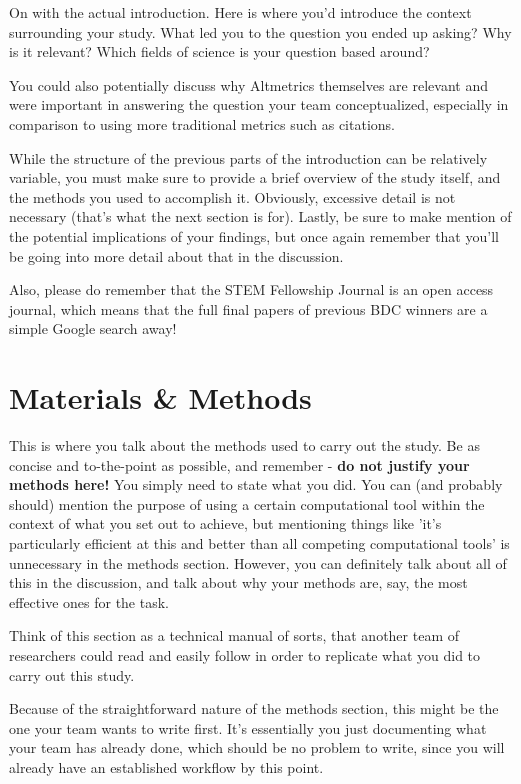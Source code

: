 \documentclass[10pt, letterpaper]{article}
\begin{document}
On with the actual introduction. Here is where you'd introduce the context surrounding your study. What led you to the question you ended up asking? Why is it relevant? Which fields of science is your question based around?

You could also potentially discuss why Altmetrics themselves are relevant and were important in answering the question your team conceptualized, especially in comparison to using more traditional metrics such as citations.

While the structure of the previous parts of the introduction can be relatively variable, you must make sure to provide a brief overview of the study itself, and the methods you used to accomplish it. Obviously, excessive detail is not necessary (that's what the next section is for). Lastly, be sure to make mention of the potential implications of your findings, but once again remember that you'll be going into more detail about that in the discussion.

Also, please do remember that the STEM Fellowship Journal is an open access journal, which means that the full final papers of previous BDC winners are a simple Google search away!

\section{Materials \& Methods}

This is where you talk about the methods used to carry out the study. Be as concise and to-the-point as possible, and remember - \textbf{do not justify your methods here!} You simply need to state what you did. You can (and probably should) mention the purpose of using a certain computational tool within the context of what you set out to achieve, but mentioning things like 'it's particularly efficient at this and better than all competing computational tools' is unnecessary in the methods section. However, you can definitely talk about all of this in the discussion, and talk about why your methods are, say, the most effective ones for the task.

Think of this section as a technical manual of sorts, that another team of researchers could read and easily follow in order to replicate what you did to carry out this study.

Because of the straightforward nature of the methods section, this might be the one your team wants to write first. It's essentially you just documenting what your team has already done, which should be no problem to write, since you will already have an established workflow by this point.
\end{document}
